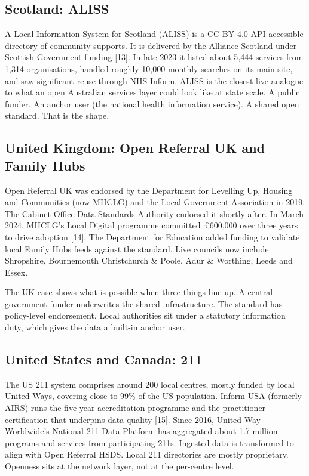 \documentclass[11pt,a4paper]{article}
\begin{document}
\subsection{Scotland: ALISS}

A Local Information System for Scotland (ALISS) is a CC-BY 4.0 API-accessible directory of community supports. It is delivered by the Alliance Scotland under Scottish Government funding [13]. In late 2023 it listed about 5{,}444 services from 1{,}314 organisations, handled roughly 10{,}000 monthly searches on its main site, and saw significant reuse through NHS Inform. ALISS is the closest live analogue to what an open Australian services layer could look like at state scale. A public funder. An anchor user (the national health information service). A shared open standard. That is the shape.

\subsection{United Kingdom: Open Referral UK and Family Hubs}

Open Referral UK was endorsed by the Department for Levelling Up, Housing and Communities (now MHCLG) and the Local Government Association in 2019. The Cabinet Office Data Standards Authority endorsed it shortly after. In March 2024, MHCLG's Local Digital programme committed \pounds{}600{,}000 over three years to drive adoption [14]. The Department for Education added funding to validate local Family Hubs feeds against the standard. Live councils now include Shropshire, Bournemouth Christchurch \& Poole, Adur \& Worthing, Leeds and Essex.

The UK case shows what is possible when three things line up. A central-government funder underwrites the shared infrastructure. The standard has policy-level endorsement. Local authorities sit under a statutory information duty, which gives the data a built-in anchor user.

\subsection{United States and Canada: 211}

The US 211 system comprises around 200 local centres, mostly funded by local United Ways, covering close to 99\% of the US population. Inform USA (formerly AIRS) runs the five-year accreditation programme and the practitioner certification that underpins data quality [15]. Since 2016, United Way Worldwide's National 211 Data Platform has aggregated about 1.7 million programs and services from participating 211s. Ingested data is transformed to align with Open Referral HSDS. Local 211 directories are mostly proprietary. Openness sits at the network layer, not at the per-centre level.
\end{document}

